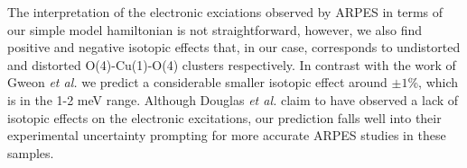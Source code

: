 The interpretation of the electronic exciations observed by ARPES in terms of our simple model hamiltonian is not straightforward, however, we also find positive and negative isotopic effects that, in our case, corresponds to undistorted and distorted O(4)-Cu(1)-O(4) clusters respectively.
In contrast with the work of Gweon \emph{et al.\/} we predict a considerable smaller isotopic effect around $\pm 1$\%, which is in the 1-2 meV range.
Although Douglas \emph{et al.\/} claim to have observed a lack of isotopic effects on the electronic excitations, our prediction falls well into their experimental uncertainty prompting for more accurate ARPES studies in these samples.
